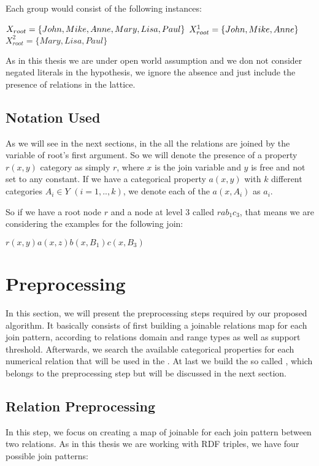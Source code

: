 Each group would consist of the following instances:

$X_{root}=\{John,Mike,Anne,Mary,Lisa,Paul\} \\$
$X_{root}^1=\{John,Mike,Anne\} \\$
$X_{root}^2=\{Mary,Lisa,Paul\}$

As in this thesis we are under open world assumption and we don not consider negated literals in the hypothesis, we
ignore
the absence and just include the presence of relations in the lattice.


\subsection{Notation Used}

As we will see in the next sections, in the \graphname all the relations are joined by the variable of root's first
argument. So we will denote the presence of a property $r(x,y)$ category as simply $r$, where $x$ is the join variable
and $y$ is free and not set to any constant. If we have a categorical property $a(x,y)$ with $k$ different categories
$A_i \in Y$ $(i=1,..,k)$, we denote each of the $a(x,A_i)$ as $a_i$.

So if we have a root node $r$ and a node at level 3 called $rab_1c_3$, that means we are considering the examples for
the following join:

$r(x,y)a(x,z)b(x,B_1)c(x,B_3)$


\section{Preprocessing}

In this section, we will present the preprocessing steps required by our proposed algorithm. It basically consists of
first building a joinable relations map for each join pattern, according
to relations domain and range types as well as support threshold. Afterwards, we search the available categorical
properties for each numerical relation that will be used in the \graphname. At last we build the so called \graphname,
which belongs to the preprocessing step but will be discussed in the next section.

\subsection{Relation Preprocessing}

In this step, we focus on creating a map of joinable for each join pattern between two relations. As in this thesis we
are working with RDF triples, we have four possible join patterns:

